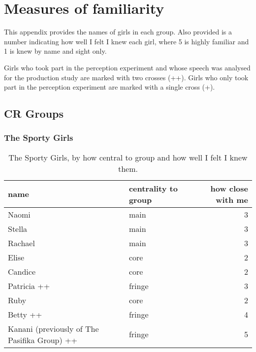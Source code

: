 %


%
\chapter{Measures of familiarity}\label{app:socialgroups}
\noindent This appendix provides the names of girls in each group.  Also provided is a number indicating how well I felt I knew each girl, where 5 is highly familiar and 1 is knew by name and sight only. 

Girls who took part in the perception experiment and whose speech was analysed for the production study are marked with two crosses (++).  Girls who only took part in the perception experiment are marked with a single cross (+).


\section{CR Groups}

\subsection{The Sporty Girls}
\nopagebreak
\begin{table}[ht]
\caption{The Sporty Girls, by how central to group and how well I felt I knew them.}\label{append:Sporty}
	\centering
		\begin{tabular}{llr} \\
		\hline
		
			name & centrality to group & how close with me  \\
			\hline
Naomi   & main & 3 \\
Stella  & main & 3 \\
Rachael & main & 3 \\
Elise   & core & 2 \\
Candice & core & 2 \\
Patricia ++ & fringe & 3 \\
Ruby    & core &  2 \\
Betty  ++  & fringe & 4 \\
Kanani (previously of The Pasifika Group) ++  & fringe & 5 \\
   \hline
		\end{tabular}
\end{table}

